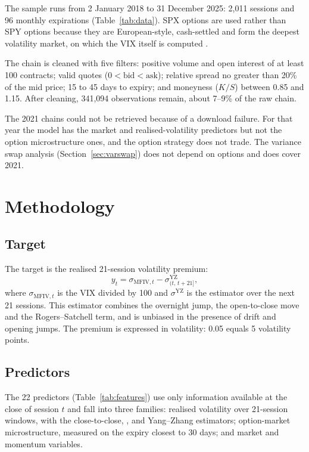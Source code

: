 \documentclass[11pt,a4paper]{article}
\begin{document}
The sample runs from 2 January 2018 to 31 December 2025: 2,011 sessions and 96 monthly expirations (Table~\ref{tab:data}). SPX options are used rather than SPY options because they are European-style, cash-settled and form the deepest volatility market, on which the VIX itself is computed \citep{cboe2019}.

The chain is cleaned with five filters: positive volume and open interest of at least 100 contracts; valid quotes ($0<\text{bid}<\text{ask}$); relative spread no greater than 20\% of the mid price; 15 to 45 days to expiry; and moneyness ($K/S$) between 0.85 and 1.15. After cleaning, 341,094 observations remain, about 7--9\% of the raw chain.

The 2021 chains could not be retrieved because of a download failure. For that year the model has the market and realised-volatility predictors but not the option microstructure ones, and the option strategy does not trade. The variance swap analysis (Section~\ref{sec:varswap}) does not depend on options and does cover 2021.

\section{Methodology}\label{sec:method}

\subsection{Target}

The target is the realised 21-session volatility premium:
\begin{equation}\label{eq:target}
  y_t = \sigma_{\text{MFIV},t} - \sigma^{\text{YZ}}_{(t,\,t+21]},
\end{equation}
where $\sigma_{\text{MFIV},t}$ is the VIX divided by 100 and $\sigma^{\text{YZ}}$ is the \citet{yangzhang2000} estimator over the next 21 sessions. This estimator combines the overnight jump, the open-to-close move and the Rogers--Satchell term, and is unbiased in the presence of drift and opening jumps. The premium is expressed in volatility: 0.05 equals 5 volatility points.

\subsection{Predictors}

The 22 predictors (Table~\ref{tab:features}) use only information available at the close of session $t$ and fall into three families: realised volatility over 21-session windows, with the close-to-close, \citet{parkinson1980}, \citet{garmanklass1980} and Yang--Zhang estimators; option-market microstructure, measured on the expiry closest to 30 days; and market and momentum variables.
\end{document}
